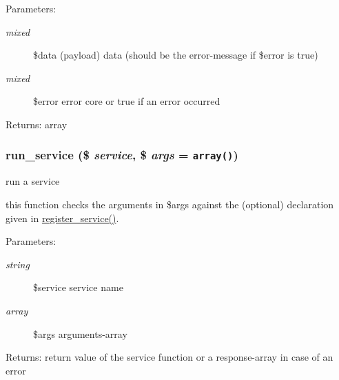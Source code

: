 \begin{Desc}
\item[Parameters:]
\begin{description}
\item[{\em mixed}]\$data (payload) data (should be the error-message if \$error is true) \item[{\em mixed}]\$error error core or true if an error occurred \end{description}
\end{Desc}
\begin{Desc}
\item[Returns:]array \end{Desc}
\hypertarget{modules_8inc_8php_3d581f1636df2e24ffe7b013a12fb1db}{
\subsubsection[{run\_\-service}]{\setlength{\rightskip}{0pt plus 5cm}run\_\-service (\$ {\em service}, \/  \$ {\em args} = {\tt array()})}}
\label{modules_8inc_8php_3d581f1636df2e24ffe7b013a12fb1db}


run a service

this function checks the arguments in \$args against the (optional) declaration given in \hyperlink{modules_8inc_8php_e6ed600fb2ce39a4b0837bbb01fe8d6e}{register\_\-service()}. \begin{Desc}
\item[Parameters:]
\begin{description}
\item[{\em string}]\$service service name \item[{\em array}]\$args arguments-array \end{description}
\end{Desc}
\begin{Desc}
\item[Returns:]return value of the service function or a response-array in case of an error \end{Desc}
